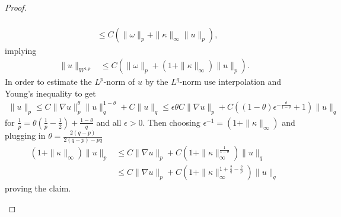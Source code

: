 \documentclass{article}
\theoremstyle{definition}
\theoremstyle{definition}
\begin{document}
\begin{proof}
\begin{itemize}
\begin{equation}
\begin{aligned}
            \\
            &
            \leq C \left(\|\omega\|_p+ \|\kappa\|_\infty \|u\|_p\right),
        \end{aligned}
    \end{equation}
    implying
    \begin{align}
        \label{elliptic-regularity-u-in-Wonep-bound}
        \|u\|_{W^{1,p}} &\leq C \left(\|\omega\|_p+(1+ \|\kappa\|_\infty) \|u\|_p\right).
    \end{align}
    In order to estimate the $L^p$-norm of $u$ by the $L^q$-norm use interpolation and Young's inequality to get
    \begin{align*}
        \|u\|_p \leq C \|\nabla u\|_p^\theta \|u\|_q^{1-\theta} + C \|u\|_q \leq \epsilon \theta C \|\nabla u\|_p + C \left( (1-\theta)\epsilon^{-\frac{\theta}{1-\theta}}+1\right)\|u\|_q 
    \end{align*}
    for $\frac{1}{p}=\theta \left(\frac{1}{p}-\frac{1}{2}\right)+\frac{1-\theta}{q}$ and all $\epsilon>0$. Then choosing $\epsilon^{-1}=(1+\|\kappa\|_\infty)$ and plugging in $\theta = \frac{2(q-p)}{2(q-p)-pq}$
    \begin{align*}
        (1+\|\kappa\|_\infty) \|u\|_p &\leq C \|\nabla u\|_p + C\left(1+\|\kappa\|_\infty^{\frac{1}{1-\theta}}\right)\|u\|_q 
        \\
        &\leq C \|\nabla u\|_p + C\left(1+\|\kappa\|_\infty^{1+\frac{2}{q}-\frac{2}{p}}\right)\|u\|_q
    \end{align*}
    proving the claim.


\end{itemize}
\end{proof}
\end{document}
